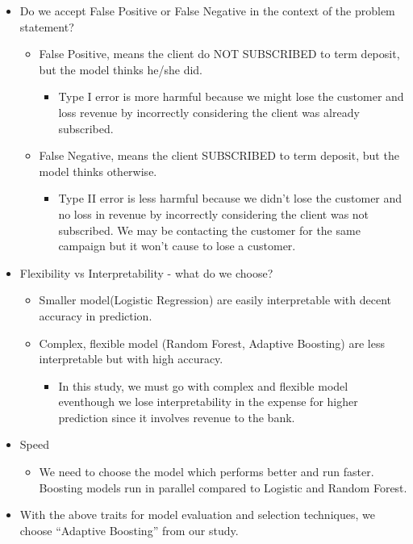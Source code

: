 \documentclass[
]{article}
\providecommand{\tightlist}{%
  \setlength{\itemsep}{0pt}\setlength{\parskip}{0pt}}
\begin{document}
\begin{itemize}
\item
  Do we accept False Positive or False Negative in the context of the
  problem statement?

  \begin{itemize}
  \item
    False Positive, means the client do NOT SUBSCRIBED to term deposit,
    but the model thinks he/she did.

    \begin{itemize}
    \tightlist
    \item
      Type I error is more harmful because we might lose the customer
      and loss revenue by incorrectly considering the client was already
      subscribed.
    \end{itemize}
  \item
    False Negative, means the client SUBSCRIBED to term deposit, but the
    model thinks otherwise.

    \begin{itemize}
    \tightlist
    \item
      Type II error is less harmful because we didn't lose the customer
      and no loss in revenue by incorrectly considering the client was
      not subscribed. We may be contacting the customer for the same
      campaign but it won't cause to lose a customer.
    \end{itemize}
  \end{itemize}
\item
  Flexibility vs Interpretability - what do we choose?

  \begin{itemize}
  \item
    Smaller model(Logistic Regression) are easily interpretable with
    decent accuracy in prediction.
  \item
    Complex, flexible model (Random Forest, Adaptive Boosting) are less
    interpretable but with high accuracy.

    \begin{itemize}
    \tightlist
    \item
      In this study, we must go with complex and flexible model
      eventhough we lose interpretability in the expense for higher
      prediction since it involves revenue to the bank.
    \end{itemize}
  \end{itemize}
\item
  Speed

  \begin{itemize}
  \tightlist
  \item
    We need to choose the model which performs better and run faster.
    Boosting models run in parallel compared to Logistic and Random
    Forest.
  \end{itemize}
\item
  With the above traits for model evaluation and selection techniques,
  we choose ``Adaptive Boosting'' from our study.
\end{itemize}
\end{document}
